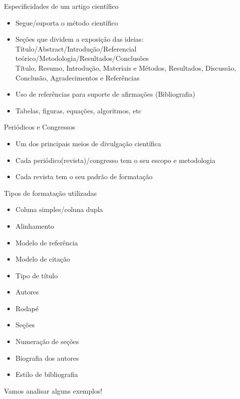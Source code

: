 \documentclass[aspectratio=169,xcolor=dvipsnames]{beamer}
\begin{document}
\begin{frame}{Especificidades de um artigo científico}

    \begin{itemize}
        \item Segue/suporta o método científico
        \item Seções que dividem a exposição das ideias: \\
        Título/Abstract/Introdução/Referencial teórico/Metodologia/Resultados/Conclusões \\
        Título, Resumo, Introdução, Materiais e Métodos, Resultados, Discussão, Conclusão, Agradecimentos e Referências
        \item Uso de referências para suporte de afirmações (Bibliografia)
        \item Tabelas, figuras, equações, algoritmos, etc
    \end{itemize}
    
\end{frame}


\begin{frame}{Periódicos e Congressos}
    \begin{itemize}
        \item Um dos principais meios de divulgação científica
        \item Cada periódico(revista)/congresso tem o seu escopo e metodologia
        \item Cada revista tem o seu padrão de formatação
    \end{itemize}
\end{frame}
    
\begin{frame}{Tipos de formatação utilizadas}
    \begin{itemize}
        \item Coluna simples/coluna dupla
        \item Alinhamento
        \item Modelo de referência
        \item Modelo de citação
        \item Tipo de título
        \item Autores 
        \item Rodapé
        \item Seções
        \item Numeração de seções
        \item Biografia dos autores 
        \item Estilo de bibliografia
    \end{itemize}
    Vamos analisar alguns exemplos!
\end{frame}
\end{document}
